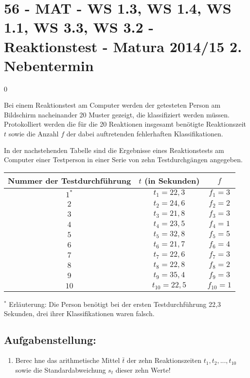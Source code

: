 \section{56 - MAT - WS 1.3, WS 1.4, WS 1.1, WS 3.3, WS 3.2 - Reaktionstest - Matura 2014/15 2. Nebentermin}

\begin{langesbeispiel} \item[0] %
				
	Bei einem Reaktionstest am Computer werden der getesteten Person am Bildschirm nacheinander 20 Muster gezeigt, die klassifiziert werden müssen. Protokolliert werden die für die 20 Reaktionen insgesamt benötigte Reaktionszeit $t$ sowie die Anzahl $f$ der dabei auftretenden fehlerhaften Klassifikationen. 
	
	In der nachstehenden Tabelle sind die Ergebnisse eines Reaktionstests am Computer einer Testperson in einer Serie von zehn Testdurchgängen angegeben.
	
	\begin{center}
		\begin{tabular}{|c|c|c|}\hline
		Nummer der Testdurchführung&$t$ (in Sekunden)&$f$\\ \hline
		$1^*$&$t_1=22,3$&$f_1=3$\\ \hline
		$2$&$t_2=24,6$&$f_2=2$\\ \hline
		$3$&$t_3=21,8$&$f_3=3$\\ \hline
		$4$&$t_4=23,5$&$f_4=1$\\ \hline
		$5$&$t_5=32,8$&$f_5=5$\\ \hline
		$6$&$t_6=21,7$&$f_6=4$\\ \hline
		$7$&$t_7=22,6$&$f_7=3$\\ \hline
		$8$&$t_8=22,8$&$f_8=2$\\ \hline
		$9$&$t_9=35,4$&$f_9=3$\\ \hline
		$10$&$t_{10}=22,5$&$f_10=1$\\ \hline
		\end{tabular}
		
		$^*$ Erläuterung: Die Person benötigt bei der ersten Testdurchführung 22,3 Sekunden, drei ihrer Klassifikationen waren falsch.
	\end{center}



\subsection{Aufgabenstellung:}
\begin{enumerate}
	\item {} Berec hne das arithmetische Mittel $\bar{t}$ der zehn Reaktionszeiten $t_1, t_2, ..., t_{10}$ sowie die Standardabweichung $s_t$ dieser zehn Werte!\leer
	

\end{enumerate}
\end{langesbeispiel}
